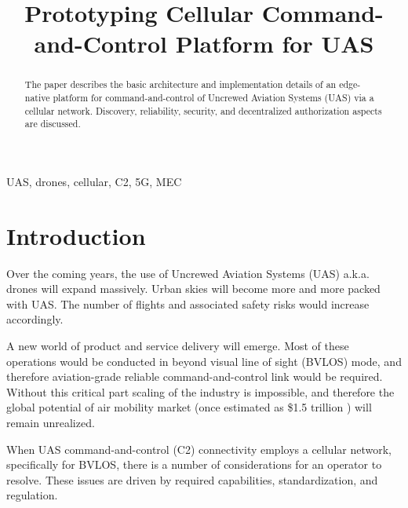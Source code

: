 \documentclass[a4paper,conference]{IEEEtran}
\newcommand{\authorfont}{\fontsize{11pt}{10pt}\selectfont}
\begin{document}
\title{Prototyping Cellular Command-and-Control Platform for UAS \\\vspace{10pt} }

\author{\IEEEauthorblockN{\authorfont Boris Resnick}
}

\maketitle

\begin{abstract}
The paper describes the basic architecture and implementation details of an edge-native platform for command-and-control of Uncrewed Aviation Systems (UAS) via a cellular network. Discovery, reliability, security, and decentralized authorization aspects are discussed.
\end{abstract}

\begin{IEEEkeywords}
UAS, drones, cellular, C2, 5G, MEC
\end{IEEEkeywords}

\section{Introduction}
Over the coming years, the use of Uncrewed Aviation Systems (UAS) a.k.a. drones will expand massively. Urban skies will become more and more packed with UAS. The number of flights and associated safety risks would increase accordingly.

A new world of product and service delivery will emerge. Most of these operations would be conducted in beyond visual line of sight (BVLOS) mode, and therefore aviation-grade reliable command-and-control link would be required. Without this critical part scaling of the industry is impossible, and therefore the global potential of air mobility market (once estimated as \$1.5 trillion \cite{market}) will remain unrealized. 

When UAS command-and-control (C2) connectivity employs a cellular network, specifically for BVLOS, there is a number of considerations for an operator to resolve. These issues are driven by required capabilities, standardization, and regulation.
\end{document}
